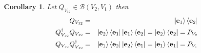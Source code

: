 \documentclass[aps,preprint]{revtex4}
\newtheorem{corollary}[theorem]{Corollary}
\begin{document}
\begin{corollary}
Let $Q_{V_{12}}\in \mathcal{B}\left( V_{2},V_{1}\right) $ then 
\begin{eqnarray}
Q_{V_{12}} &=&\left\vert \mathbf{e}_{1}\right\rangle \left\langle \mathbf{e}%
_{2}\right\vert \\
Q_{V_{12}}^{\dagger }Q_{V_{12}} &=&\left\vert \mathbf{e}_{2}\right\rangle
\left\langle \mathbf{e}_{1}\right\vert \left\vert \mathbf{e}%
_{1}\right\rangle \left\langle \mathbf{e}_{2}\right\vert =\left\vert \mathbf{%
e}_{2}\right\rangle \left\langle \mathbf{e}_{2}\right\vert =P_{V_{2}} \\
Q_{V_{12}}Q_{V_{12}}^{\dagger } &=&\left\vert \mathbf{e}_{1}\right\rangle
\left\langle \mathbf{e}_{2}\right\vert \left\vert \mathbf{e}%
_{2}\right\rangle \left\langle \mathbf{e}_{1}\right\vert =\left\vert \mathbf{%
e}_{1}\right\rangle \left\langle \mathbf{e}_{1}\right\vert =P_{V_{1}}
\end{eqnarray}
\end{corollary}
\end{document}
